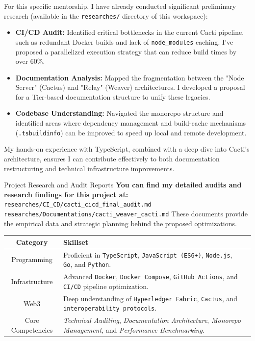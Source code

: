 For this specific mentorship, I have already conducted significant preliminary research (available in the \texttt{researches/} directory of this workspace):
\begin{itemize}[leftmargin=*]
    \item \textbf{CI/CD Audit:} Identified critical bottlenecks in the current Cacti pipeline, such as redundant Docker builds and lack of \texttt{node\_modules} caching. I've proposed a parallelized execution strategy that can reduce build times by over 60\%.
    \item \textbf{Documentation Analysis:} Mapped the fragmentation between the "Node Server" (Cactus) and "Relay" (Weaver) architectures. I developed a proposal for a Tier-based documentation structure to unify these legacies.
    \item \textbf{Codebase Understanding:} Navigated the monorepo structure and identified areas where dependency management and build-cache mechanisms (\texttt{.tsbuildinfo}) can be improved to speed up local and remote development.
\end{itemize}

My hands-on experience with TypeScript, combined with a deep dive into Cacti's architecture, ensures I can contribute effectively to both documentation restructuring and technical infrastructure improvements.

\begin{pocbox}{Project Research and Audit Reports}
    \textbf{You can find my detailed audits and research findings for this project at:} \\
    \texttt{researches/CI\_CD/cacti\_cicd\_final\_audit.md} \\
    \texttt{researches/Documentations/cacti\_weaver\_cacti.md}
    \vspace{0.2cm}
    These documents provide the empirical data and strategic planning behind the proposed optimizations.
\end{pocbox}
\vspace{0.5cm}

\begin{table}[!htbp]
\centering
\large
\begin{tabularx}{\textwidth}{c p{3.2cm} X}
\toprule
\textbf{\color{primary} Category} & \textbf{\color{primary} Skillset} \\
\midrule
Programming & Proficient in \texttt{TypeScript}, \texttt{JavaScript (ES6+)}, \texttt{Node.js}, \texttt{Go}, and \texttt{Python}. \\
Infrastructure & Advanced \texttt{Docker}, \texttt{Docker Compose}, \texttt{GitHub Actions}, and \texttt{CI/CD} pipeline optimization. \\
Web3 & Deep understanding of \texttt{Hyperledger Fabric}, \texttt{Cactus}, and \texttt{interoperability protocols}. \\
Core Competencies & \textit{Technical Auditing}, \textit{Documentation Architecture}, \textit{Monorepo Management}, and \textit{Performance Benchmarking}. \\
\bottomrule
\end{tabularx}
\end{table}

